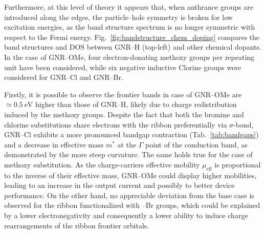Furthermore, at this level of theory it appears that, when anthrance groups are introduced along the edges, the particle--hole symmetry is broken for low excitation energies, as the band structure spectrum is no longer symmetric with respect to the Fermi energy. Fig.~\ref{fig:bandstructure_chem_doping} compares the band structures and \gls{DOS} between GNR--H (top-left) and other chemical dopants. In the case of GNR--OMe, four electron-donating methoxy groups per repeating unit have been considered, while six negative inductive Clorine groups were considered for GNR--Cl and GNR--Br.

Firstly, it is possible to observe the frontier bands in case of GNR--OMe are $\simeq\SI{0.5}{\electronvolt}$ higher than those of GNR--H, likely due to charge redistribution induced by the methoxy groups. Despite the fact that both the bromine and chlorine substitutions share electrons with the ribbon preferentially via $\sigma$-bond, GNR--Cl exhibits a more pronounced bandgap contraction (Tab.~\ref{tab:bandgaps}) and a decrease in effective mass $m^*$ at the $\Gamma$ point of the conduction band, as demonstrated by the more steep curvature. The same holds true for the case of methoxy substitution. As the charge-carriers effective mobility $\mu_\textrm{eff}$ is proportional to the inverse of their effective mass, GNR--OMe could display higher mobilities, leading to an increase in the output current and possibly to better device performance. On the other hand, no appreciable deviation from the base case is observed for the ribbon functionalized with --Br groups, which could be explained by a lower electronegativity and consequently a lower ability to induce charge rearrangements of the ribbon frontier orbitals.
%
